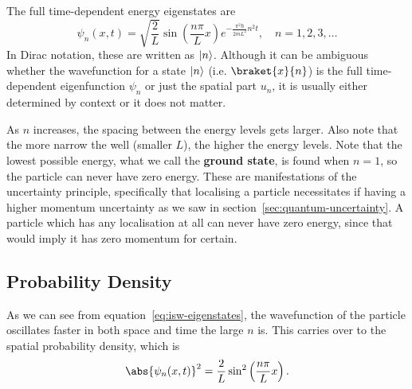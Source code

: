 \documentclass[../quantum_mechanics.tex]{subfiles}
\begin{document}
            The full time-dependent energy eigenstates are
            \begin{equation}\label{eq:isw-eigenstates}
                \psi_n(x,t)=\sqrt{\frac{2}{L}}\sin\left(\frac{n\pi}{L}x\right)e^{-\frac{\pi^2\hbar}{2mL^2}n^2t},\quad n=1,2,3,\dots
            \end{equation}
            In Dirac notation, these are written as $\lvert n\rangle$.
            Although it can be ambiguous whether the wavefunction for a state $\lvert n\rangle$ (i.e. $\braket{x}{n}$) is the full time-dependent eigenfunction $\psi_n$ or just the spatial part $u_n$, it is usually either determined by context or it does not matter. 

            As $n$ increases, the spacing between the energy levels gets larger.
            Also note that the more narrow the well (smaller $L$), the higher the energy levels.
            Note that the lowest possible energy, what we call the \textbf{ground state}, is found when $n=1$, so the particle can never have zero energy.
            These are manifestations of the uncertainty principle, specifically that localising a particle necessitates if having a higher momentum uncertainty as we saw in section~\ref{sec:quantum-uncertainty}.
            A particle which has any localisation at all can never have zero energy, since that would imply it has zero momentum for certain.


        \subsection{Probability Density}\label{sec:infinite-square-well:subsec:probability-density}
            As we can see from equation~\ref{eq:isw-eigenstates}, the wavefunction of the particle oscillates faster in both space and time the large $n$ is.
            This carries over to the spatial probability density, which is
            \begin{equation}
                \abs{\psi_n(x,t)}^2=\frac{2}{L}\sin^2\left(\frac{n\pi}{L}x\right).
            \end{equation}
\end{document}

